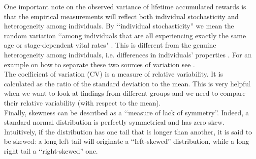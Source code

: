 \documentclass[\main/main.tex]{subfiles}
\begin{document}
One important note on the observed variance of lifetime accumulated rewards is that the empirical measurements will reflect both individual stochasticity and heterogeneity among individuals. By \lq\lq individual stochasticity'' we mean the random variation \lq\lq among individuals that are all experiencing exactly the same age or stage-dependent vital rates" \citep{Caswell2015}. This is different from the genuine heterogeneity among individuals, i.e. differences in individuals' properties \citep{Hartemink2017a, Caswell2011}. For an example on how to separate these two sources of variation see \cite{Caswell2001, Caswell2014}.\\

The coefficient of variation (CV) is a measure of relative variability. It is calculated as the ratio of the standard deviation to the mean. This is very helpful when we want to look at findings from different groups and we need to compare their relative variability (with respect to the mean).\\
Finally, skewness can be described as a \lq\lq measure of lack of symmetry''. Indeed, a standard normal distribution is perfectly symmetrical and has zero skew. Intuitively, if the distribution has one tail that is longer than another, it is said to be skewed: a  long left tail will originate a \lq\lq left-skewed'' distribution, while a long right tail a \lq\lq right-skewed'' one.
\end{document}
